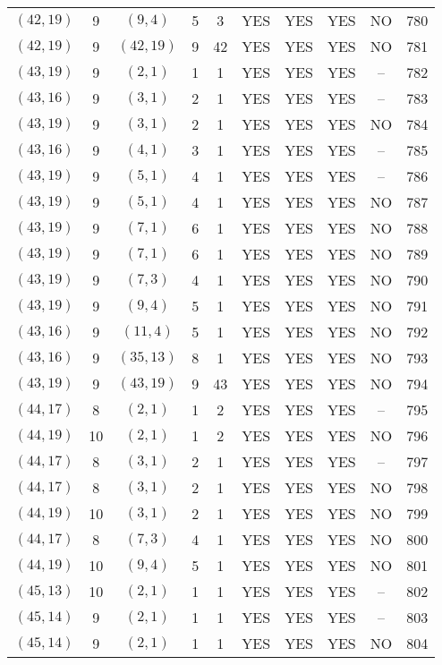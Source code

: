 \begin{longtable}{|c|c|c|c|c|c|c|c|c|c|}
$(42, 19)$ & 9 & $(9, 4)$ & 5 & 3 & YES & YES & YES & NO & 780\\
$(42, 19)$ & 9 & $(42, 19)$ & 9 & 42 & YES & YES & YES & NO & 781\\
$(43, 19)$ & 9 & $(2, 1)$ & 1 & 1 & YES & YES & YES & -- & 782\\
$(43, 16)$ & 9 & $(3, 1)$ & 2 & 1 & YES & YES & YES & -- & 783\\
$(43, 19)$ & 9 & $(3, 1)$ & 2 & 1 & YES & YES & YES & NO & 784\\
$(43, 16)$ & 9 & $(4, 1)$ & 3 & 1 & YES & YES & YES & -- & 785\\
$(43, 19)$ & 9 & $(5, 1)$ & 4 & 1 & YES & YES & YES & -- & 786\\
$(43, 19)$ & 9 & $(5, 1)$ & 4 & 1 & YES & YES & YES & NO & 787\\
$(43, 19)$ & 9 & $(7, 1)$ & 6 & 1 & YES & YES & YES & NO & 788\\
$(43, 19)$ & 9 & $(7, 1)$ & 6 & 1 & YES & YES & YES & NO & 789\\
$(43, 19)$ & 9 & $(7, 3)$ & 4 & 1 & YES & YES & YES & NO & 790\\
$(43, 19)$ & 9 & $(9, 4)$ & 5 & 1 & YES & YES & YES & NO & 791\\
$(43, 16)$ & 9 & $(11, 4)$ & 5 & 1 & YES & YES & YES & NO & 792\\
$(43, 16)$ & 9 & $(35, 13)$ & 8 & 1 & YES & YES & YES & NO & 793\\
$(43, 19)$ & 9 & $(43, 19)$ & 9 & 43 & YES & YES & YES & NO & 794\\
$(44, 17)$ & 8 & $(2, 1)$ & 1 & 2 & YES & YES & YES & -- & 795\\
$(44, 19)$ & 10 & $(2, 1)$ & 1 & 2 & YES & YES & YES & NO & 796\\
$(44, 17)$ & 8 & $(3, 1)$ & 2 & 1 & YES & YES & YES & -- & 797\\
$(44, 17)$ & 8 & $(3, 1)$ & 2 & 1 & YES & YES & YES & NO & 798\\
$(44, 19)$ & 10 & $(3, 1)$ & 2 & 1 & YES & YES & YES & NO & 799\\
$(44, 17)$ & 8 & $(7, 3)$ & 4 & 1 & YES & YES & YES & NO & 800\\
$(44, 19)$ & 10 & $(9, 4)$ & 5 & 1 & YES & YES & YES & NO & 801\\
$(45, 13)$ & 10 & $(2, 1)$ & 1 & 1 & YES & YES & YES & -- & 802\\
$(45, 14)$ & 9 & $(2, 1)$ & 1 & 1 & YES & YES & YES & -- & 803\\
$(45, 14)$ & 9 & $(2, 1)$ & 1 & 1 & YES & YES & YES & NO & 804\\

\end{longtable}
